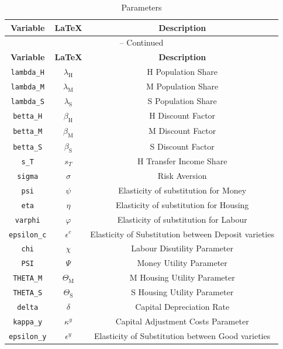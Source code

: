 \begin{center}
\begin{longtable}{ccc}
\caption{Parameters}\\%
\hline%
\multicolumn{1}{c}{\textbf{Variable}} &
\multicolumn{1}{c}{\textbf{\LaTeX}} &
\multicolumn{1}{c}{\textbf{Description}}\\%
\hline\hline%
\endfirsthead
\multicolumn{3}{c}{{\tablename} \thetable{} -- Continued}\\%
\hline%
\multicolumn{1}{c}{\textbf{Variable}} &
\multicolumn{1}{c}{\textbf{\LaTeX}} &
\multicolumn{1}{c}{\textbf{Description}}\\%
\hline\hline%
\endhead
\texttt{lambda\_H} & $\lambda_\mathrm{H}$ & H Population Share\\
\texttt{lambda\_M} & $\lambda_\mathrm{M}$ & M Population Share\\
\texttt{lambda\_S} & $\lambda_\mathrm{S}$ & S Population Share\\
\texttt{betta\_H} & $\beta_\mathrm{H}$ & H Discount Factor\\
\texttt{betta\_M} & $\beta_\mathrm{M}$ & M Discount Factor\\
\texttt{betta\_S} & $\beta_\mathrm{S}$ & S Discount Factor\\
\texttt{s\_T} & $s_T$ & H Transfer Income Share\\
\texttt{sigma} & $\sigma$ & Risk Aversion\\
\texttt{psi} & $\psi$ & Elasticity of substitution for Money\\
\texttt{eta} & $\eta$ & Elasticity of substitution for Housing\\
\texttt{varphi} & $\varphi$ & Elasticity of substitution for Labour\\
\texttt{epsilon\_c} & $\epsilon^c$ & Elasticity of Substitution between Deposit varieties\\
\texttt{chi} & $\chi$ & Labour Disutility Parameter\\
\texttt{PSI} & $\Psi$ & Money Utility Parameter\\
\texttt{THETA\_M} & $\Theta_\mathrm{M}$ & M Housing Utility Parameter\\
\texttt{THETA\_S} & $\Theta_\mathrm{S}$ & S Housing Utility Parameter\\
\texttt{delta} & $\delta$ & Capital Depreciation Rate\\
\texttt{kappa\_y} & $\kappa^y$ & Capital Adjustment Costs Parameter\\
\texttt{epsilon\_y} & $\epsilon^y$ & Elasticity of Substitution between Good varieties\\

\end{longtable}
\end{center}
